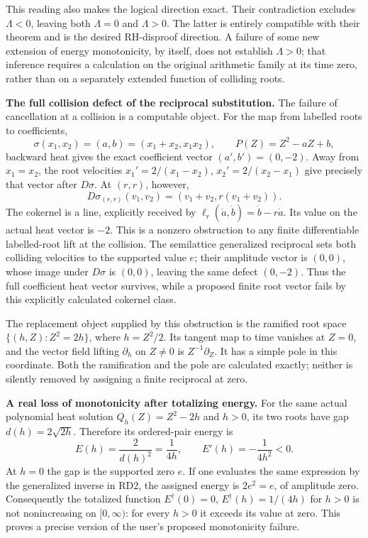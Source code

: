 This reading also makes the logical direction exact. Their contradiction
excludes $\Lambda<0$, leaving both $\Lambda=0$ and $\Lambda>0$.
The latter is entirely compatible with their theorem and is the desired
RH-disproof direction. A failure of some new extension of energy
monotonicity, by itself, does not establish $\Lambda>0$; that inference
requires a calculation on the original arithmetic family at its time
zero, rather than on a separately extended function of colliding roots.

\RD\textbf{The full collision defect of the reciprocal substitution.}
The failure of cancellation at a collision is a computable object.
For the map from labelled roots to coefficients,
\[
 \sigma(x_1,x_2)=(a,b)=(x_1+x_2,x_1x_2),\qquad
 P(Z)=Z^2-aZ+b,
\]
backward heat gives the exact coefficient vector $(a',b')=(0,-2)$.
Away from $x_1=x_2$, the root velocities
$x_1'=2/(x_1-x_2)$, $x_2'=2/(x_2-x_1)$ give precisely that
vector after $D\sigma$.
At $(r,r)$, however,
\[
 D\sigma_{(r,r)}(v_1,v_2)=(v_1+v_2,r(v_1+v_2)).
\]
The cokernel is a line, explicitly received by
$\ell_r(\dot a,\dot b)=\dot b-r\dot a$. Its value on the actual
heat vector is $-2$. This is a nonzero obstruction to any finite
differentiable labelled-root lift at the collision.
The semilattice generalized reciprocal sets both colliding velocities
to the supported value $e$; their amplitude vector is $(0,0)$, whose
image under $D\sigma$ is $(0,0)$, leaving the same defect $(0,-2)$.
Thus the full coefficient heat vector survives, while a proposed finite
root vector fails by this explicitly calculated cokernel class.

The replacement object supplied by this obstruction is the ramified
root space $\{(h,Z):Z^2=2h\}$, where $h=Z^2/2$. Its tangent map to
time vanishes at $Z=0$, and the vector field lifting $\partial_h$ on
$Z\ne0$ is $Z^{-1}\partial_Z$. It has a simple pole in this
coordinate. Both the ramification and the pole are calculated exactly;
neither is silently removed by assigning a finite reciprocal at zero.

\RD\textbf{A real loss of monotonicity after totalizing energy.}
For the same actual polynomial heat solution $Q_h(Z)=Z^2-2h$ and
$h>0$, its two roots have gap $d(h)=2\sqrt{2h}$. Therefore its
ordered-pair energy is
\[
 E(h)=\frac2{d(h)^2}=\frac1{4h},\qquad E'(h)=-\frac1{4h^2}<0.
\]
At $h=0$ the gap is the supported zero $e$. If one evaluates the
same expression by the generalized inverse in RD2, the assigned
energy is $2e^2=e$, of amplitude zero. Consequently the totalized
function $E^\dagger(0)=0$, $E^\dagger(h)=1/(4h)$ for $h>0$ is
not nonincreasing on $[0,\infty)$: for every $h>0$ it exceeds its
value at zero. This proves a precise version of the user's proposed
monotonicity failure.

